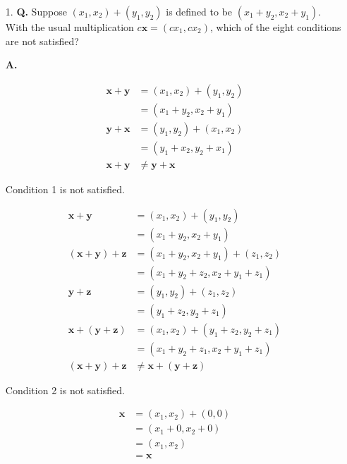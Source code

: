 \documentclass[main.tex]{subfiles}
\begin{document}
\begin{enumerate}
    \item [1.] \textbf{Q.} Suppose $\left(x_{1}, x_{2}\right)+\left(y_{1}, y_{2}\right)$ is defined to be $\left(x_{1}+y_{2}, x_{2}+y_{1}\right)$. With the usual multiplication $c \bm{x}=\left(c x_{1}, c x_{2}\right)$, which of the eight conditions are not satisfied? 
    
    \textbf{A.}
    
    $$
    \begin{aligned}
    \mathbf{x}+\mathbf{y} &=\left(x_{1}, x_{2}\right)+\left(y_{1}, y_{2}\right) \\
    & =\left(x_{1}+y_{2}, x_{2}+y_{1}\right)\\
    \mathbf{y}+\mathbf{x} &= \left(y_{1}, y_{2}\right)+\left(x_{1}, x_{2}\right) \\
    &= \left(y_{1}+x_{2}, y_{2}+x_{1}\right)\\
    \mathbf{x}+\mathbf{y} &\neq \mathbf{y}+\mathbf{x}
    \end{aligned}
    $$
    
    Condition 1 is not satisfied. 

    $$
    \begin{aligned}
    \mathbf{x}+\mathbf{y} & = \left(x_{1}, x_{2}\right)+\left(y_{1}, y_{2}\right) \\
    & = \left(x_{1}+y_{2}, x_{2}+y_{1}\right) \\
    (\mathbf{x}+\mathbf{y})+\mathbf{z} &= \left(x_{1}+y_{2}, x_{2}+y_{1}\right)+\left(z_{1}, z_{2}\right) \\
    &= \left(x_{1}+y_{2}+z_{2}, x_{2}+y_{1}+z_{1}\right)\\
    \mathbf{y}+\mathbf{z} &=\left(y_{1}, y_{2}\right)+\left(z_{1}, z_{2}\right) \\
    &= \left(y_{1}+z_{2}, y_{2}+z_{1}\right) \\
    \mathbf{x}+(\mathbf{y}+\mathbf{z}) &=\left(x_{1}, x_{2}\right)+\left(y_{1}+z_{2}, y_{2}+z_{1}\right) \\
    &= \left(x_{1}+y_{2}+z_{1}, x_{2}+y_{1}+z_{1}\right)\\
    (\mathbf{x}+\mathbf{y})+\mathbf{z} &\neq \mathbf{x}+(\mathbf{y}+\mathbf{z})
    \end{aligned}
    $$
    
    Condition 2 is not satisfied.
    
    $$
    \begin{aligned}
    \mathbf{x} &=\left(x_{1}, x_{2}\right)+(0,0) \\
    &= \left(x_{1}+0, x_{2}+0\right) \\
    &= \left(x_{1}, x_{2}\right) \\
    &= \mathbf{x}
    \end{aligned}
    $$
    

\end{enumerate}
\end{document}
